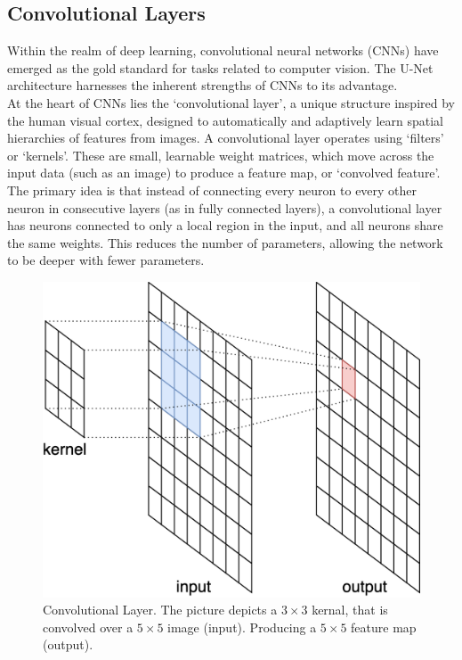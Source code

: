 \subsection{Convolutional Layers}
Within the realm of deep learning, convolutional neural networks (CNNs) have emerged as the gold standard for tasks related to computer vision.
The U-Net architecture harnesses the inherent strengths of CNNs to its advantage.\\[1ex]
\noindent At the heart of CNNs lies the `convolutional layer', a unique structure inspired by the human visual cortex, designed to automatically and adaptively learn spatial hierarchies of features from images.
A convolutional layer operates using `filters' or `kernels'. These are small, learnable weight matrices, which move across the input data (such as an image) to produce a feature map, or `convolved feature'.
The primary idea is that instead of connecting every neuron to every other neuron in consecutive layers (as in fully connected layers),
a convolutional layer has neurons connected to only a local region in the input, and all neurons share the same weights. This reduces the number of parameters,
allowing the network to be deeper with fewer parameters.\cite[5-7]{oshea_introduction_2015}

\begin{figure}[!hb]
	\centering
	\includegraphics[width=0.4\linewidth]{images/Convolution}
	\caption{Convolutional Layer. The picture depicts a $3\times3$ kernal, that is convolved over a $5\times5$ image (input). Producing a $5\times5$ feature map (output).}
	\label{fig:Conv}
\end{figure}

